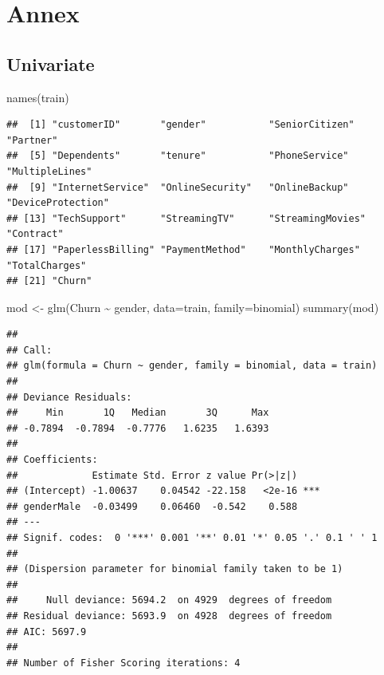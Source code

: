 \documentclass[
  twoside]{article}
\newenvironment{Shaded}{\begin{snugshade}}{\end{snugshade}}
\newcommand{\AttributeTok}[1]{\textcolor[rgb]{0.77,0.63,0.00}{#1}}
\newcommand{\FunctionTok}[1]{\textcolor[rgb]{0.00,0.00,0.00}{#1}}
\newcommand{\NormalTok}[1]{#1}
\newcommand{\OtherTok}[1]{\textcolor[rgb]{0.56,0.35,0.01}{#1}}
\newcommand{\SpecialCharTok}[1]{\textcolor[rgb]{0.00,0.00,0.00}{#1}}
\begin{document}
\newpage

\hypertarget{annex}{%
\section{Annex}\label{annex}}

\hypertarget{univariate}{%
\subsection{Univariate}\label{univariate}}

\begin{Shaded}
\begin{Highlighting}[]
\FunctionTok{names}\NormalTok{(train)}
\end{Highlighting}
\end{Shaded}

\begin{verbatim}
##  [1] "customerID"       "gender"           "SeniorCitizen"    "Partner"         
##  [5] "Dependents"       "tenure"           "PhoneService"     "MultipleLines"   
##  [9] "InternetService"  "OnlineSecurity"   "OnlineBackup"     "DeviceProtection"
## [13] "TechSupport"      "StreamingTV"      "StreamingMovies"  "Contract"        
## [17] "PaperlessBilling" "PaymentMethod"    "MonthlyCharges"   "TotalCharges"    
## [21] "Churn"
\end{verbatim}

\begin{Shaded}
\begin{Highlighting}[]
\NormalTok{mod }\OtherTok{\textless{}{-}} \FunctionTok{glm}\NormalTok{(Churn }\SpecialCharTok{\textasciitilde{}}\NormalTok{ gender, }\AttributeTok{data=}\NormalTok{train, }\AttributeTok{family=}\NormalTok{binomial)}
\FunctionTok{summary}\NormalTok{(mod)}
\end{Highlighting}
\end{Shaded}

\begin{verbatim}
## 
## Call:
## glm(formula = Churn ~ gender, family = binomial, data = train)
## 
## Deviance Residuals: 
##     Min       1Q   Median       3Q      Max  
## -0.7894  -0.7894  -0.7776   1.6235   1.6393  
## 
## Coefficients:
##             Estimate Std. Error z value Pr(>|z|)    
## (Intercept) -1.00637    0.04542 -22.158   <2e-16 ***
## genderMale  -0.03499    0.06460  -0.542    0.588    
## ---
## Signif. codes:  0 '***' 0.001 '**' 0.01 '*' 0.05 '.' 0.1 ' ' 1
## 
## (Dispersion parameter for binomial family taken to be 1)
## 
##     Null deviance: 5694.2  on 4929  degrees of freedom
## Residual deviance: 5693.9  on 4928  degrees of freedom
## AIC: 5697.9
## 
## Number of Fisher Scoring iterations: 4
\end{verbatim}
\end{document}
